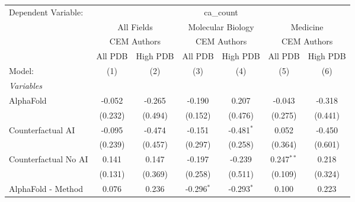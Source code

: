 \begingroup
\centering
\begin{tabular}{lcccccc}
   \tabularnewline \midrule \midrule
   Dependent Variable: & \multicolumn{6}{c}{ca\_count}\\
 & \multicolumn{2}{c}{All Fields} & \multicolumn{2}{c}{Molecular Biology} & \multicolumn{2}{c}{Medicine} \\
\cmidrule(lr){2-3} \cmidrule(lr){4-5} \cmidrule(lr){6-7}
 & \multicolumn{2}{c}{CEM Authors} & \multicolumn{2}{c}{CEM Authors} & \multicolumn{2}{c}{CEM Authors} \\
\cmidrule(lr){2-3} \cmidrule(lr){4-5} \cmidrule(lr){6-7}
 & \multicolumn{1}{c}{All PDB} & \multicolumn{1}{c}{High PDB} & \multicolumn{1}{c}{All PDB} & \multicolumn{1}{c}{High PDB} & \multicolumn{1}{c}{All PDB} & \multicolumn{1}{c}{High PDB} \\
\cmidrule(lr){2-2} \cmidrule(lr){3-3} \cmidrule(lr){4-4} \cmidrule(lr){5-5} \cmidrule(lr){6-6} \cmidrule(lr){7-7}
   Model:                                                     & (1)           & (2)           & (3)           & (4)           & (5)           & (6)\\  
   \midrule
   \emph{Variables}\\
   AlphaFold                                                  & -0.052        & -0.265        & -0.190        & 0.207         & -0.043        & -0.318\\   
                                                              & (0.232)       & (0.494)       & (0.152)       & (0.476)       & (0.275)       & (0.441)\\   
   Counterfactual AI                                          & -0.095        & -0.474        & -0.151        & -0.481$^{*}$  & 0.052         & -0.450\\   
                                                              & (0.239)       & (0.457)       & (0.297)       & (0.258)       & (0.364)       & (0.601)\\   
   Counterfactual No AI                                       & 0.141         & 0.147         & -0.197        & -0.239        & 0.247$^{**}$  & 0.218\\   
                                                              & (0.131)       & (0.369)       & (0.258)       & (0.511)       & (0.109)       & (0.324)\\   
   AlphaFold - Method                                         & 0.076         & 0.236         & -0.296$^{*}$  & -0.293$^{*}$  & 0.100         & 0.223\\   

\end{tabular}

